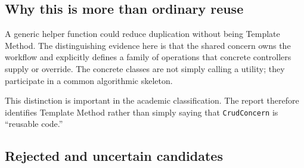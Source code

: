 \documentclass[10pt,a4paper]{article}
\newcommand{\code}[1]{\texttt{\small #1}}
\begin{document}
\subsection{Why this is more than ordinary reuse}

A generic helper function could reduce duplication without being Template Method. The distinguishing evidence here is that the shared concern owns the workflow and explicitly defines a family of operations that concrete controllers supply or override. The concrete classes are not simply calling a utility; they participate in a common algorithmic skeleton.

This distinction is important in the academic classification. The report therefore identifies Template Method rather than simply saying that \code{CrudConcern} is ``reusable code.''

\subsection{Rejected and uncertain candidates}
\end{document}
